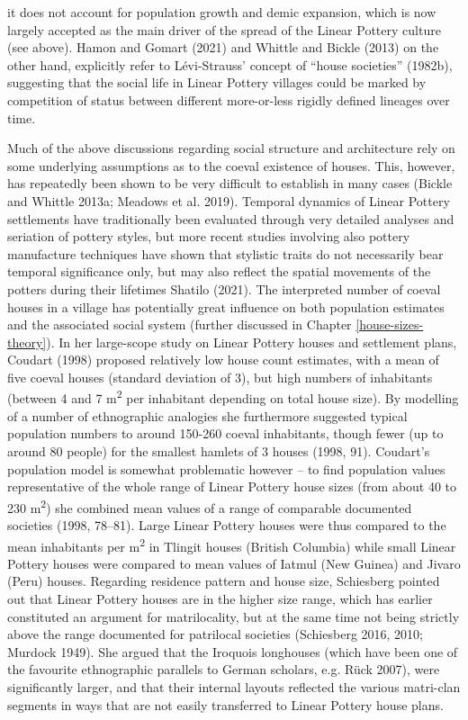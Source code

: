 \documentclass[
  12pt,
  a4paper, twoside]{book}
\begin{document}
it does not account for population growth and demic expansion, which is now largely accepted as the main driver of the spread of the Linear Pottery culture (see above). Hamon and Gomart (2021) and Whittle and Bickle (2013) on the other hand, explicitly refer to Lévi-Strauss' concept of ``house societies'' (1982b), suggesting that the social life in Linear Pottery villages could be marked by competition of status between different more-or-less rigidly defined lineages over time.

Much of the above discussions regarding social structure and architecture rely on some underlying assumptions as to the coeval existence of houses. This, however, has repeatedly been shown to be very difficult to establish in many cases (Bickle and Whittle 2013a; Meadows et al. 2019). Temporal dynamics of Linear Pottery settlements have traditionally been evaluated through very detailed analyses and seriation of pottery styles, but more recent studies involving also pottery manufacture techniques have shown that stylistic traits do not necessarily bear temporal significance only, but may also reflect the spatial movements of the potters during their lifetimes Shatilo (2021). The interpreted number of coeval houses in a village has potentially great influence on both population estimates and the associated social system (further discussed in Chapter \ref{house-sizes-theory}). In her large-scope study on Linear Pottery houses and settlement plans, Coudart (1998) proposed relatively low house count estimates, with a mean of five coeval houses (standard deviation of 3), but high numbers of inhabitants (between 4 and 7 m\textsuperscript{2} per inhabitant depending on total house size). By modelling of a number of ethnographic analogies she furthermore suggested typical population numbers to around 150-260 coeval inhabitants, though fewer (up to around 80 people) for the smallest hamlets of 3 houses (1998, 91). Coudart's population model is somewhat problematic however -- to find population values representative of the whole range of Linear Pottery house sizes (from about 40 to 230 m\textsuperscript{2}) she combined mean values of a range of comparable documented societies (1998, 78--81). Large Linear Pottery houses were thus compared to the mean inhabitants per m\textsuperscript{2} in Tlingit houses (British Columbia) while small Linear Pottery houses were compared to mean values of Iatmul (New Guinea) and Jivaro (Peru) houses. Regarding residence pattern and house size, Schiesberg pointed out that Linear Pottery houses are in the higher size range, which has earlier constituted an argument for matrilocality, but at the same time not being strictly above the range documented for patrilocal societies (Schiesberg 2016, 2010; Murdock 1949). She argued that the Iroquois longhouses (which have been one of the favourite ethnographic parallels to German scholars, e.g. Rück 2007), were significantly larger, and that their internal layouts reflected the various matri-clan segments in ways that are not easily transferred to Linear Pottery house plans.
\end{document}
